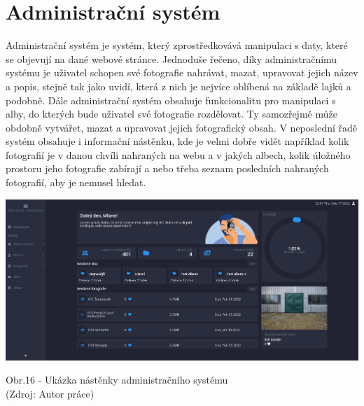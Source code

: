 \documentclass[12pt,a4paper]{report}
\begin{document}
  \chapter{Administrační systém}
 
  Administrační systém je systém, který zprostředkovává manipulaci s daty, které se objevují na
  dané webové stránce. Jednoduše řečeno, díky administračnímu systému je uživatel schopen své
  fotografie nahrávat, mazat, upravovat jejich název a popis, stejně tak jako uvidí, která z nich je
  nejvíce oblíbená na základě lajků a podobně. Dále administrační systém obsahuje funkcionalitu
  pro manipulaci s alby, do kterých bude uživatel své fotografie rozdělovat. Ty samozřejmě může
  obdobně vytvářet, mazat a upravovat jejich fotografický obsah. V neposlední řadě systém
  obsahuje i informační nástěnku, kde je velmi dobře vidět například kolik fotografií je v danou chvíli
  nahraných na webu a v jakých albech, kolik úložného prostoru jeho fotografie zabírají a nebo
  třeba seznam posledních nahraných fotografií, aby je nemusel hledat.

  \vspace*{0.5cm}
  \noindent\includegraphics[width=\linewidth]{admin.png}
  \begin{center}
    Obr.16 -   Ukázka nástěnky administračního systému \\
    (Zdroj: Autor práce)
  \end{center}
  \vspace*{0.5cm}
\end{document}
